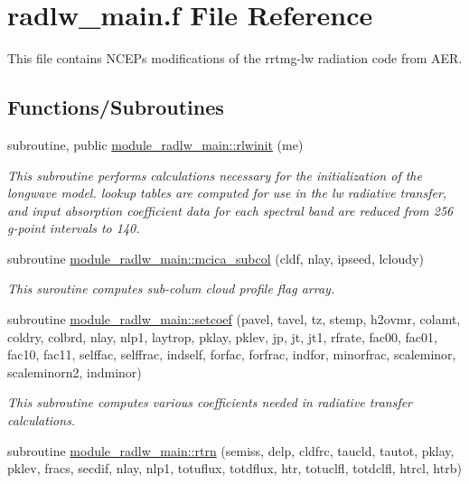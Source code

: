 \hypertarget{radlw__main_8f}{}\section{radlw\+\_\+main.\+f File Reference}
\label{radlw__main_8f}


This file contains N\+C\+EP\textquotesingle{}s modifications of the rrtmg-\/lw radiation code from A\+ER.  


\subsection*{Functions/\+Subroutines}
\begin{DoxyCompactItemize}
\item 
subroutine, public \hyperlink{group__module__radlw__main_gaa9569479682c83b26584b7e9ee6841fa}{module\+\_\+radlw\+\_\+main\+::rlwinit} (me)
\begin{DoxyCompactList}\small\item\em This subroutine performs calculations necessary for the initialization of the longwave model. lookup tables are computed for use in the lw radiative transfer, and input absorption coefficient data for each spectral band are reduced from 256 g-\/point intervals to 140. \end{DoxyCompactList}\item 
subroutine \hyperlink{group__module__radlw__main_ga9318778651bca6ec1f1776da6c21dfda}{module\+\_\+radlw\+\_\+main\+::mcica\+\_\+subcol} (cldf, nlay, ipseed, lcloudy)
\begin{DoxyCompactList}\small\item\em This suroutine computes sub-\/colum cloud profile flag array. \end{DoxyCompactList}\item 
subroutine \hyperlink{group__module__radlw__main_gaeb7b74288cf87988c14bf6e24a2039ae}{module\+\_\+radlw\+\_\+main\+::setcoef} (pavel, tavel, tz, stemp, h2ovmr, colamt, coldry, colbrd, nlay, nlp1, laytrop, pklay, pklev, jp, jt, jt1, rfrate, fac00, fac01, fac10, fac11, selffac, selffrac, indself, forfac, forfrac, indfor, minorfrac, scaleminor, scaleminorn2, indminor)
\begin{DoxyCompactList}\small\item\em This subroutine computes various coefficients needed in radiative transfer calculations. \end{DoxyCompactList}\item 
subroutine \hyperlink{group__module__radlw__main_gab002119955eb2b82f16352459180f5ed}{module\+\_\+radlw\+\_\+main\+::rtrn} (semiss, delp, cldfrc, taucld, tautot, pklay, pklev, fracs, secdif, nlay, nlp1, totuflux, totdflux, htr, totuclfl, totdclfl, htrcl, htrb)

\end{DoxyCompactItemize}

